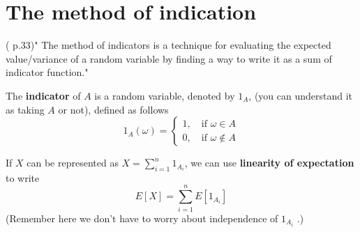 \section{The method of indication}
(\cite{Und_Chatterjee} p.33)" The method of indicators is a technique for evaluating the expected value/variance of a random variable by finding a way to write it as a sum of indicator function."

The \textbf{indicator} of \(A\) is a random variable, denoted by \(1_A\), (you can understand it as taking \(A\) or not), defined as follows  
\[
    1_A(\omega) = \begin{cases} 1, \quad \text{if } \omega \in A \\ 0,\quad \text{if } \omega \notin A \end{cases}
\]

If \(X\) can be represented as \(X = \sum_{i=1}^{n} 1_{A_i}\), we can use \textbf{linearity of expectation} to write 
\[
    E[X] = \sum_{i=1}^{n} E[1_{A_i}]
\]  
(Remember here we don't have to worry about independence of \(1_{A_i}\) .)
